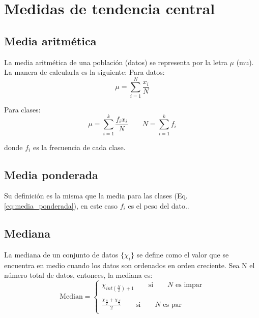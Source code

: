 \section{Medidas de tendencia central}
\subsection{Media aritmética}
La media aritmética de una población (datos) se representa por la letra $\mu$ (mu). La manera de calcularla es la siguiente:
Para datos:
\begin{equation}
    \mu = \sum_{i=1}^N \frac{x_i}{N}
\end{equation}

Para clases:
\begin{equation}
    \mu = \sum_{i=1}^k \frac{f_ix_i}{N} \qquad N=\sum_{i=1}^k f_i
    \label{eq:media_ponderada}
\end{equation}

donde $f_i$ es la frecuencia de cada clase.

\subsection{Media ponderada}
Su definición es la misma que la media para las clases (Eq. \ref{eq:media_ponderada}), en este caso $f_i$ es el peso del dato..

\subsection{Mediana}
La mediana de un conjunto de datos $\{\chi_i\}$ se define como el valor que se encuentra en medio cuando los datos son ordenados en orden creciente. Sea N el número total de datos, entonces, la mediana es:
\begin{equation}
    \text{Median} = \left\lbrace\begin{matrix}
        \chi_{int(\frac{N}{2})+1} \qquad \text{si} \qquad N\text{ es impar}                     \\
        \\
        \frac{\chi_{\frac{N}{2}}+\chi_{\frac{N}{2}}}{2} \qquad \text{si} \qquad N\text{ es par} \\
    \end{matrix} \right.
\end{equation}

